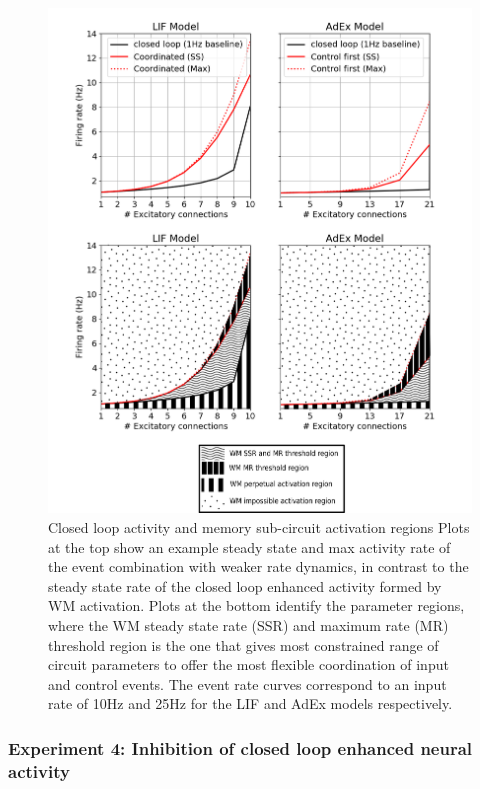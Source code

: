 \documentclass[10pt]{article}
\begin{document}
\begin{figure}[h!]
\begin{center}
\includegraphics[width=0.70\columnwidth]{figures/experiment_3/experiment_3}
\caption{{Closed loop activity and memory sub-circuit activation regions
{\label{197355}}
Plots at the top show an example steady state and max activity rate of
the event combination with weaker rate dynamics, in contrast to the
steady state rate of the closed loop enhanced activity formed by WM
activation. Plots at the bottom identify the parameter regions, where
the WM steady state rate (SSR) and maximum rate (MR) threshold region is
the one that gives most constrained range of circuit parameters to offer
the most flexible coordination of input and control events. The event
rate curves correspond to an input rate of 10Hz and 25Hz for the LIF and
AdEx models respectively.~
{\label{197355}}%
}}
\end{center}
\end{figure}

\subsubsection{Experiment 4: Inhibition of closed loop enhanced neural
activity}

{\label{554287}}
\end{document}
